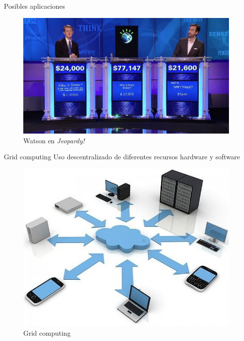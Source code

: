 \documentclass[compress]{beamer}
\begin{document}
\begin{frame}{Posibles aplicaciones}
	\begin{figure}
		\centering
		\includegraphics[width=.95\linewidth]{./Imagenes/j-watson.jpg}
		\caption{Watson en \textit{Jeopardy!}}
		\label{watson}
	\end{figure}
\end{frame}

\begin{frame}
	\begin{block}{Grid computing}
		Uso descentralizado de diferentes recursos hardware y software
	\end{block}
	\begin{figure}
		\centering
		\includegraphics[width=.65\linewidth]{./Imagenes/grid-c.jpg}
		\caption{Grid computing}
		\label{grid-c}
	\end{figure}
\end{frame}
\end{document}
